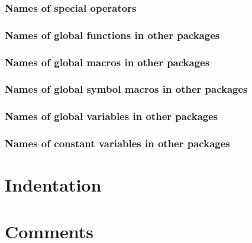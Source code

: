 \subsubsection{Names of special operators}

\subsubsection{Names of global functions in other packages}

\subsubsection{Names of global macros in other packages}

\subsubsection{Names of global symbol macros in other packages}

\subsubsection{Names of global variables in other packages}

\subsubsection{Names of constant variables in other packages}

\section{Indentation}

\section{Comments}


